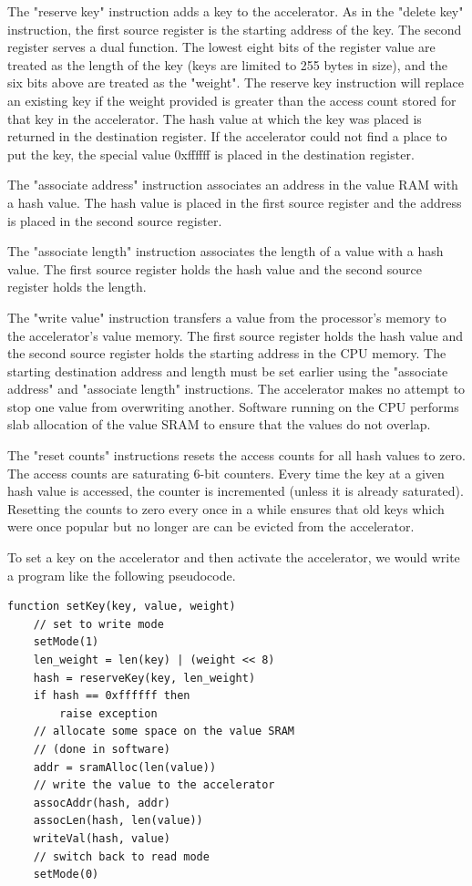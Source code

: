 The "reserve key" instruction adds a key to the accelerator. As in the
"delete key" instruction, the first source register is the starting address
of the key. The second register serves a dual function. The lowest eight
bits of the register value are treated as the length of the key (keys are
limited to 255 bytes in size), and the six bits above are treated as the
"weight". The reserve key instruction will replace an existing key if the
weight provided is greater than the access count stored for that key in the
accelerator. The hash value at which the key was placed is returned in the
destination register. If the accelerator could not find a place to put the key,
the special value 0xffffff is placed in the destination register.

The "associate address" instruction associates an address in the value RAM
with a hash value. The hash value is placed in the first source register and
the address is placed in the second source register.

The "associate length" instruction associates the length of a value with a hash
value. The first source register holds the hash value and the second source
register holds the length.

The "write value" instruction transfers a value from the processor's memory to
the accelerator's value memory. The first source register holds the hash value
and the second source register holds the starting address in the CPU memory.
The starting destination address and length must be set earlier using the
"associate address" and "associate length" instructions. The accelerator makes
no attempt to stop one value from overwriting another. Software running on the
CPU performs slab allocation of the value SRAM to ensure that the values do
not overlap.

The "reset counts" instructions resets the access counts for all hash values
to zero. The access counts are saturating 6-bit counters. Every time the key
at a given hash value is accessed, the counter is incremented (unless it is
already saturated). Resetting the counts to zero every once in a while ensures
that old keys which were once popular but no longer are can be evicted from
the accelerator.

To set a key on the accelerator and then activate the accelerator, we would
write a program like the following pseudocode.

\begin{verbatim}
function setKey(key, value, weight)
    // set to write mode
    setMode(1)
    len_weight = len(key) | (weight << 8)
    hash = reserveKey(key, len_weight)
    if hash == 0xffffff then
        raise exception
    // allocate some space on the value SRAM
    // (done in software)
    addr = sramAlloc(len(value))
    // write the value to the accelerator
    assocAddr(hash, addr)
    assocLen(hash, len(value))
    writeVal(hash, value)
    // switch back to read mode
    setMode(0)
\end{verbatim}
